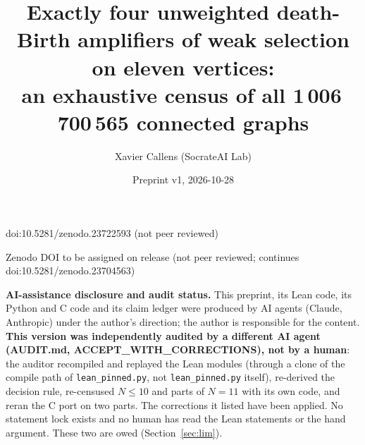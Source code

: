 \documentclass[10pt]{article}
\title{Exactly four unweighted death-Birth amplifiers of weak selection on eleven vertices:\\
an exhaustive census of all 1\,006\,700\,565 connected graphs}
\author{Xavier Callens (SocrateAI Lab)}
\date{Preprint v1, 2026-10-28}
\begin{document}
\maketitle
\begin{center}\small doi:10.5281/zenodo.23722593 \quad (not peer reviewed)\end{center}

\begin{center}\small Zenodo DOI to be assigned on release \quad (not peer reviewed; continues doi:10.5281/zenodo.23704563)\end{center}

\noindent\textbf{AI-assistance disclosure and audit status.} This preprint, its Lean code, its Python and C code and its claim ledger were
produced by AI agents (Claude, Anthropic) under the author's direction; the author is responsible for the content.
\textbf{This version was independently audited by a different AI agent (AUDIT.md, ACCEPT\_WITH\_CORRECTIONS), not by a human}: the auditor recompiled and replayed the Lean modules (through a clone of the compile path of \texttt{lean\_pinned.py}, not \texttt{lean\_pinned.py} itself), re-derived the decision rule, re-censused $N\le10$ and parts of $N=11$ with its own code, and reran the C port on two parts. The corrections it listed have been applied. No statement lock exists and no human has read the Lean statements or the hand argument. These two
are owed (Section~\ref{sec:lim}).
\end{document}
